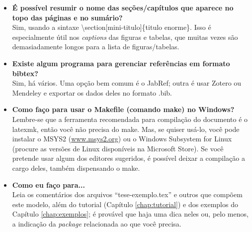\begin{itemize}
\item \textbf{É possível resumir o nome das seções/capítulos que aparece no topo das páginas e no sumário?}\\
Sim, usando a sintaxe \textsf{\textbackslash{}section[mini-titulo]\{titulo enorme\}}. Isso é especialmente útil nos \textit{captions} das figuras e tabelas, que muitas vezes são demasiadamente longos para a lista de figuras/tabelas.

\item \textbf{Existe algum programa para gerenciar referências em formato bibtex?}\\
Sim, há vários. Uma opção bem comum é o JabRef; outra é usar Zotero ou Mendeley e exportar os dados deles no formato .bib.

\item \textbf{Como faço para usar o Makefile (comando make) no Windows?}\\
Lembre-se que a ferramenta recomendada para compilação do documento é o \textsf{latexmk}, então você não precisa do \textsf{make}. Mas, se quiser usá-lo, você pode instalar o MSYS2 (\url{www.msys2.org}) ou o Windows Subsystem for Linux (procure as versões de Linux disponíveis na Microsoft Store). Se você pretende usar algum dos editores sugeridos, é possível deixar a compilação a cargo deles, também dispensando o \textsf{make}.

\item \textbf{Como eu faço para...}\\
Leia os comentários dos arquivos ``tese-exemplo.tex'' e outros que compõem este modelo, além do tutorial (Capítulo \ref{chap:tutorial}) e dos exemplos do Capítulo \ref{chap:exemplos}; é provável que haja uma dica neles ou, pelo menos, a indicação da \textit{package} relacionada ao que você precisa.

\end{itemize}
